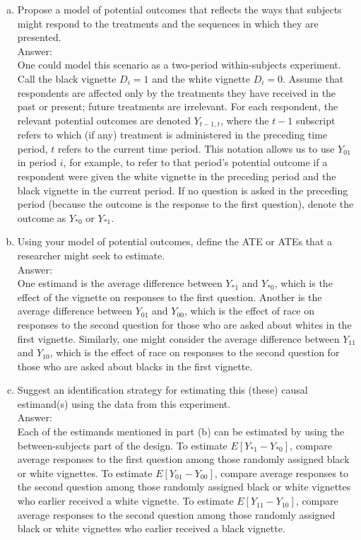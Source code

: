 \documentclass[11pt,notitlepage]{article}\usepackage[]{graphicx}\usepackage[]{color}
\begin{document}
\begin{enumerate}[a)]
\item Propose a model of potential outcomes that reflects the ways that subjects might respond to the treatments and the sequences in which they are presented.\\
Answer:\\
One could model this scenario as a two-period within-subjects experiment. Call the black vignette $D_i=1$ and the white vignette $D_i=0$. Assume that respondents are affected only by the treatments they have received in the past or present; future treatments are irrelevant. For each respondent, the relevant potential outcomes are denoted $Y_{t-1,t}$, where the $t-1$ subscript refers to which (if any) treatment is administered in the preceding time period, $t$ refers to the current time period. This notation allows us to use $Y_{01}$ in period $i$, for example, to refer to that period's potential outcome if a respondent were given the white vignette in the preceding period and the black vignette in the current period. If no question is asked in the preceding period (because the outcome is the response to the first question), denote the outcome as $Y_{*0}$ or $Y_{*1}$.
\item Using your model of potential outcomes, define the ATE or ATEs that a researcher might seek to estimate.\\
Answer:\\
One estimand is the average difference between $Y_{*1}$ and $Y_{*0}$, which is the effect of the vignette on responses to the first question. Another is the average difference between $Y_{01}$ and $Y_{00}$, which is the effect of race on responses to the second question for those who are asked about whites in the first vignette. Similarly, one might consider the average difference between $Y_{11}$ and $Y_{10}$, which is the effect of race on responses to the second question for those who are asked about blacks in the first vignette. 
\item Suggest an identification strategy for estimating this (these) causal estimand(s) using the data from this experiment.\\
Answer:\\
Each of the estimands mentioned in part (b) can be estimated by using the between-subjects part of the design. To estimate $E[Y_{*1}-Y_{*0}]$, compare average responses to the first question among those randomly assigned black or white vignettes.  To estimate $E[Y_{01}-Y_{00}]$, compare average responses to the second question among those randomly assigned black or white vignettes who earlier received a white vignette. To estimate $E[Y_{11}-Y_{10}]$, compare average responses to the second question among those randomly assigned black or white vignettes who earlier received a black vignette. 


\end{enumerate}
\end{document}
